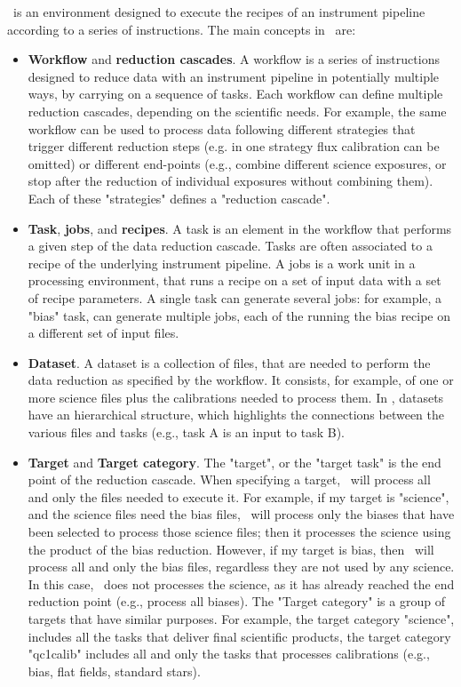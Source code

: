 
\edps\ is an environment designed to execute the recipes of an instrument pipeline according to a series of instructions. 
The main concepts in \edps\ are:

\begin{itemize}
  
\item \textbf{Workflow} and \textbf{reduction cascades}. A workflow is
  a series of instructions designed to reduce data with an instrument
  pipeline in potentially multiple ways, by carrying on a sequence of
  tasks.  Each workflow can define multiple reduction cascades,
  depending on the scientific needs.  For example, the same workflow
  can be used to process data following different strategies that
  trigger different reduction steps (e.g. in one strategy flux
  calibration can be omitted) or different end-points (e.g., combine
  different science exposures, or stop after the reduction of
  individual exposures without combining them). Each of these
  "strategies" defines a "reduction cascade".


\item \textbf{Task}, \textbf{jobs}, and \textbf{recipes}. A task is an
  element in the workflow that performs a given step of the data
  reduction cascade. Tasks are often associated to a recipe of the
  underlying instrument pipeline.  A jobs is a work unit in a
  processing environment, that runs a recipe on a set of input data
  with a set of recipe parameters.  A single task can generate several
  jobs: for example, a "bias" task, can generate multiple jobs, each
  of the running the bias recipe on a different set of input files.


\item \textbf{Dataset}. A dataset is a collection of files, that are
  needed to perform the data reduction as specified by the
  workflow. It consists, for example, of one or more science files
  plus the calibrations needed to process them. In \edps,  datasets
  have an hierarchical structure, which highlights the connections
  between the various files and tasks (e.g., task A is an input to
  task B).


\item \textbf{Target} and \textbf{Target category}. The "target", or
  the "target task" is the end point of the reduction cascade. When
  specifying a target, \edps\ will process all and only the files needed
  to execute it. For example, if my target is "science", and the
  science files need the bias files, \edps\ will process only the biases
  that have been selected to process those science files; then it
  processes the science using the product of the bias reduction.
  However, if my target is bias, then \edps\ will process all and only
  the bias files, regardless they are not used by any science.  In
  this case, \edps\ does not processes the science, as it has already reached
  the end reduction point (e.g., process all biases).  The
  "Target category" is a group of targets that have similar
  purposes. For example, the target category "science", includes all
  the tasks that deliver final scientific products, the target
  category "qc1calib" includes all and only the tasks that processes
  calibrations (e.g., bias, flat fields, standard stars).

\end{itemize}
